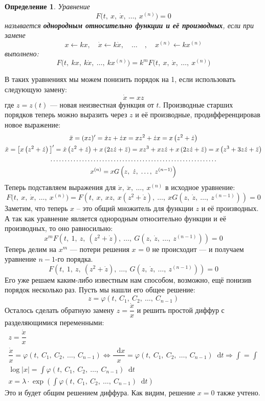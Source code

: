 \documentclass[a4paper,12pt]{article}
\newcommand{\dotffill}[1]{\parbox[t]{#1}{\dotfill}}
\newtheorem{definition}{Определение}
\renewcommand*\d{\mathop{}\!\mathrm{d}}
\newcommand{\dx}{\dot{x}}
\newcommand{\ddx}{\ddot{x}}
\newcommand{\dz}{\dot{z}}
\newcommand{\ddz}{\ddot{z}}
\newcommand{\fe}{\varphi}
\newcommand{\bto}{\Longrightarrow}
\newcommand{\ds}{\displaystyle}
\begin{document}
\begin{definition}
	Уравнение 
	\[F\big(t,\ x,\ \dx,\ \ldots,\ x^{(n)}\big) = 0\]
	называется \textbf{однородным относительно функции и её производных}, если при замене 
	\[x \leftarrow kx,\quad \dx \leftarrow k\dx,\quad \ldots \quad,\quad x^{(n)} \leftarrow kx^{(n)}\]
	выполнено:
	\[F\big(t,\ kx,\ k\dx,\ \ldots,\ kx^{(n)}\big) = k^mF\big(t,\ x,\ \dx,\ \ldots,\ x^{(n)}\big)\]
\end{definition}
В таких уравнениях мы можем понизить порядок на 1, если использовать следующую замену:
\[\dx = xz\]
где $z = z(t)$ --- новая неизвестная функция от $t$. Производные старших порядков теперь можно выразить через $z$ и её производные, продифференцировав новое выражение:
\begin{gather*}
	\ddx = (xz)' = \dx z + \dz x = xz^2 + \dz x = x\left(z^2 + \dz\right)\\
	\ddx = \big[x\left(z^2 + \dz\right)\big]' = \dx \left(z^2 + \dz\right) + x\left(2z\dz + \ddz\right) = xz^3 + xz\dz + x\left(2z\dz + \ddz\right) = x\left(z^3 + 3z\dz + \ddz\right)\\
	\dotffill{0.75\textwidth}\\
	x^{(n)} = x G\left(z,\ \dz,\ \ldots,\ z^{(n - 1)}\right)
\end{gather*}
Теперь подставляем выражения для $\dx,\ \ddx,\ \ldots,\ x^{(n)}$ в исходное уравнение:
\[F\big(t,\ x,\ \dx,\ \ldots,\ x^{(n)}\big) = F\left(t,\ x,\ xz,\ x\left(z^2 + \dz\right),\ \ldots,\ x G\left(z,\ \dz,\ \ldots,\ z^{(n - 1)}\right)\right) = 0\]
Заметим, что теперь $x$ -- это общий множитель для функции $z$ и её производных. А так как уравнение является однородным относительно функции и её производных, то оно равносильно:
\[x^mF\left(t,\ 1,\ z,\ \left(z^2 + \dz\right),\ \ldots,\ G\left(z,\ \dz,\ \ldots,\ z^{(n - 1)}\right)\right) = 0\]
Теперь делим на $x^m$ --- потери решения $x$ = 0 не происходит --- и получаем уравнение $n - 1$-го порядка.
\[F\left(t,\ 1,\ z,\ \left(z^2 + \dz\right),\ \ldots,\ G\left(z,\ \dz,\ \ldots,\ z^{(n - 1)}\right)\right) = 0\]
Его уже решаем каким-либо известным нам способом, возможно, ещё понизив порядок несколько раз. Пусть мы нашли его общее решение:
\[z = \fe\left(t,\ C_1,\ C_2,\ \ldots,\ C_{n - 1}\right)\]
Осталось сделать обратную замену $z = \dfrac{\dx}{x}$ и решить простой диффур с разделяющимися переменными:
\begin{gather*}
	z = \dfrac{\dx}{x}\\
	\dfrac{\dx}{x} = \fe\left(t,\ C_1,\ C_2,\ \ldots,\ C_{n - 1}\right) \iff \dfrac{\d x}{x} = \fe\left(t,\ C_1,\ C_2,\ \ldots,\ C_{n - 1}\right)\d t \bto \ds\int = \int\\
	\log|x| = \ds\int \fe\left(t,\ C_1,\ C_2,\ \ldots,\ C_{n - 1}\right)\d t \\
	x = \lambda \cdot \exp(\ds\int \fe\left(t,\ C_1,\ C_2,\ \ldots,\ C_{n - 1}\right)\d t)
\end{gather*}
Это и будет общим решением диффура. Как видим, решение $x = 0$ также учтено.
\ \\
\end{document}
